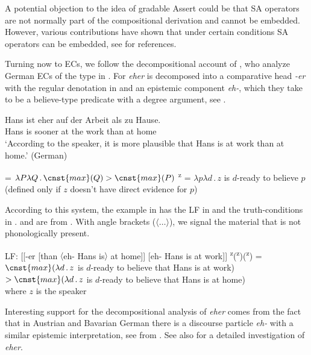 \documentclass[output=paper,
]{langscibook}
\begin{document}
\noindent A potential objection to the idea of gradable Assert could be that SA  operators are not normally part of the compositional derivation and cannot be  embedded. However, various contributions have shown that under certain conditions SA operators can be embedded, see \citet{grewol17} for references.

Turning now to ECs, we follow the decompositional account of \citet{herrub14}, who analyze German ECs of the type in . For \citet{herrub14} \textit{eher} is decomposed into a comparative head \textit{-er} with the regular denotation in  and an epistemic component \textit{eh-}, which they take to be a believe-type predicate with a degree argument, see . 


	\ea \gll Hans ist eher auf der Arbeit als zu Hause.\\ 
 	Hans is sooner at the work than at home\\
  	\glt `According to the speaker, it is more plausible that Hans is at work than at home.'  \hfill (German)  \label{ger1}
    \z 

 	\ea  \label{hr} \ea {} = $\lambda P\lambda Q\,.\,\cnst{max}(Q) > \cnst{max}(P)$ \label{sxer}
   	\ex {}\textsuperscript{z} = $\lambda p\lambda d\,.\,z$ is $d$-ready to believe $p$ \\
       (defined only if $z$ doesn't have direct evidence for $p$) \label{sxeh}
        \z \z
    
\noindent According to this system, the example in  has the LF in  and the truth-conditions in .  and  are from \cite[564--565]{herrub14}. With angle brackets ($\langle{\ldots}\rangle$), we signal the material that is not phonologically present.

	\ea \label{eher} \ea LF: [[-er [than $\langle$eh- Hans is$\rangle$ at home]] [eh- Hans is at work]] \label{ehera}
 	\ex {}\textsuperscript{z}(\textsuperscript{z})(\textsuperscript{z}) = \\ 
    $ \cnst{max}(\lambda d\,.\,z$ is $d$-ready to believe that Hans is at work) $ > \cnst{max}(\lambda d\,.\,z$ is $d$-ready to believe that Hans is at home) \\
    where $z$ is  the speaker \label{eherb}
	\z \z 

\noindent Interesting support for the decompositional analysis of \textit{eher} comes from the fact that in Austrian and Bavarian German there is a discourse particle \textit{eh-} with a similar epistemic interpretation, see  from \cite[ex.32]{herrub14}. See also \citet{zob17} for a detailed investigation of \textit{eher}. 
\end{document}
